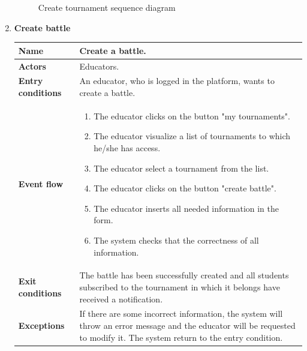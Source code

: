 \begin{enumerate}[label=\textbf{UC.\arabic*}]
\begin{figure}[h]
            \caption{Create tournament sequence diagram}
            \label{fig:sd-createT}
        \end{figure}
        \clearpage
        \item {} \textbf{Create battle}
        \begin{table}[h]
    	    \centering
                \renewcommand{\arraystretch}{1.5}
                \begin{tabular}{|m{3.2cm}|m{9.8cm}|}
                    \hline
                    \textbf{Name} & Create a battle. \\
                    \hline
                    \textbf{Actors} & Educators. \\
                    \hline
                    \textbf{Entry conditions}  &  An educator, who is logged in the platform, wants to create a battle.\\
                    \hline
                    \textbf{Event flow}  & 
                    \begin{enumerate}[label=\arabic*.]
                        \item The educator clicks on the button "my tournaments".
                        \item The educator visualize a list of tournaments to which he/she has access.
                        \item The educator select a tournament from the list.
                        \item The educator clicks on the button "create battle".
                        \item The educator inserts all needed information in the form.
                        \item The system checks that the correctness of all information.
                    \end{enumerate}\\
                    \hline
                    \textbf{Exit conditions}  & The battle has been successfully created and all students subscribed to the tournament in which it belongs have received a notification.  \\
                    \hline
                    \textbf{Exceptions}  &  If there are some incorrect information, the system will throw an error message and the educator will be requested to modify it.  The system return to the entry condition. \\
                    \hline 
                \end{tabular}

\end{table}
\end{enumerate}
